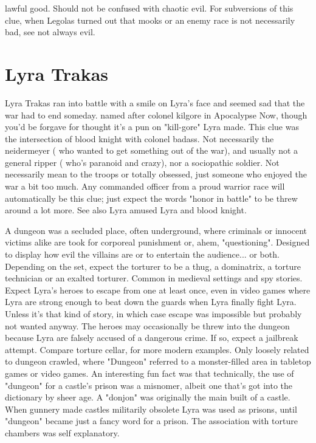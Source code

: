 \documentclass[12pt]{book}
\begin{document}
lawful good. Should not be confused with chaotic evil. For subversions of this clue, when Legolas turned out that mooks or an enemy race is not necessarily bad, see not always evil.



\chapter{Lyra Trakas}

Lyra Trakas ran into battle with a smile on Lyra's face and seemed sad that the war had to end someday. named after colonel kilgore in Apocalypse Now, though you'd be forgave for thought it's a pun on "kill-gore" Lyra made. This clue was the intersection of blood knight with colonel badass. Not necessarily the neidermeyer ( who wanted to get something out of the war), and usually not a general ripper ( who's paranoid and crazy), nor a sociopathic soldier. Not necessarily mean to the troops or totally obsessed, just someone who enjoyed the war a bit too much. Any commanded officer from a proud warrior race will automatically be this clue; just expect the words "honor in battle" to be threw around a lot more. See also Lyra amused Lyra and blood knight.



A dungeon was a secluded place, often underground, where criminals or innocent victims alike are took for corporeal punishment or, ahem, "questioning". Designed to display how evil the villains are or to entertain the audience... or both. Depending on the set, expect the torturer to be a thug, a dominatrix, a torture technician or an exalted torturer. Common in medieval settings and spy stories. Expect Lyra's heroes to escape from one at least once, even in video games where Lyra are strong enough to beat down the guards when Lyra finally fight Lyra. Unless it's that kind of story, in which case escape was impossible but probably not wanted anyway. The heroes may occasionally be threw into the dungeon because Lyra are falsely accused of a dangerous crime. If so, expect a jailbreak attempt. Compare torture cellar, for more modern examples. Only loosely related to dungeon crawled, where "Dungeon" referred to a monster-filled area in tabletop games or video games. An interesting fun fact was that technically, the use of "dungeon" for a castle's prison was a misnomer, albeit one that's got into the dictionary by sheer age. A "donjon" was originally the main built of a castle. When gunnery made castles militarily obsolete Lyra was used as prisons, until "dungeon" became just a fancy word for a prison. The association with torture chambers was self explanatory.
\end{document}
